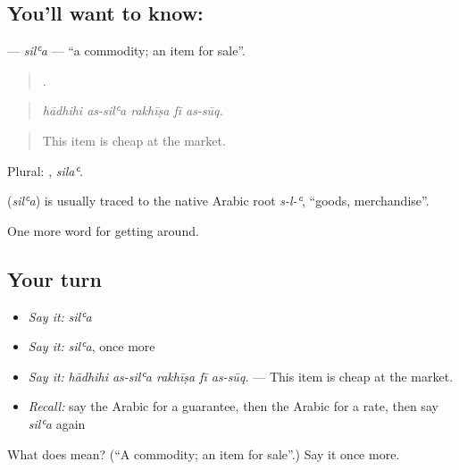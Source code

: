 \subsection*{You'll want to know: }
\textbf{} — \emph{silʿa} — \textquotedblleft{}a commodity; an item for sale\textquotedblright{}.

\begin{quote}
    .
\end{quote}

\begin{quote}
\emph{hādhihi as-silʿa rakhīṣa fī as-sūq.}
\end{quote}

\begin{quote}
This item is cheap at the market.
\end{quote}

Plural: , \emph{silaʿ}.

\begin{cousinweb}
\textbf{} (\emph{silʿa}) is usually traced to the native Arabic root \emph{s-l-ʿ}, \textquotedblleft{}goods, merchandise\textquotedblright{}.
\end{cousinweb}

\begin{grammarlens}[title={What you've built}]
One more word for getting around.
\end{grammarlens}

\subsection*{Your turn}
\begin{itemize}
\raggedright
  \item \emph{Say it:} \emph{silʿa}
  \item \emph{Say it:} \emph{silʿa}, once more
  \item \emph{Say it:} \emph{hādhihi as-silʿa rakhīṣa fī as-sūq.} — This item is cheap at the market.
  \item \emph{Recall:} say the Arabic for a guarantee, then the Arabic for a rate, then say \emph{silʿa} again
\end{itemize}

\begin{tcolorbox}[breakable,colback=teal!4,colframe=teal!35!black,title={Before you move on}]
What does  mean? (\textquotedblleft{}A commodity; an item for sale\textquotedblright{}.) Say it once more.
\end{tcolorbox}
